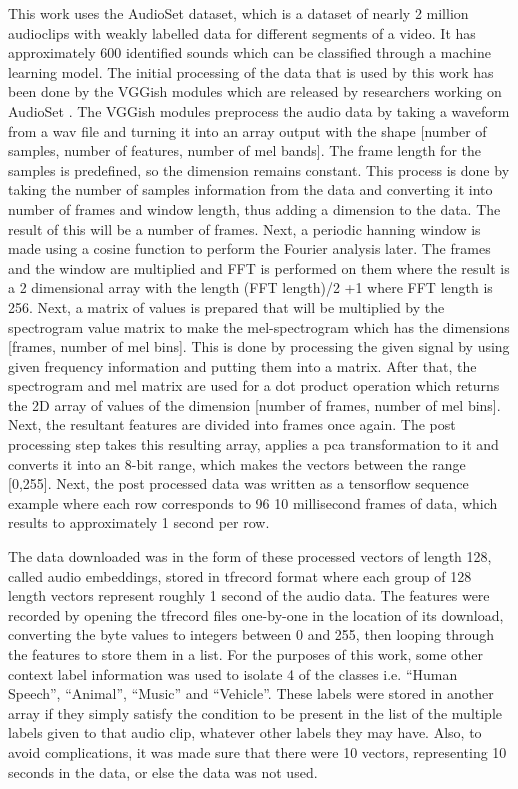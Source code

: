 \documentclass[journal]{IEEEtran}
\begin{document}
This work uses the AudioSet dataset, which is a dataset of nearly 2 million audioclips with weakly labelled data for different segments of a video. It has approximately 600 identified sounds which can be classified through a machine learning model. The initial processing of the data that is used by this work has been done by the VGGish modules which are released by researchers working on AudioSet \cite{11}. The VGGish modules preprocess the audio data by taking a waveform from a wav file and turning it into  an array output with the shape [number of samples, number of features, number of mel bands]. The frame length for the samples is predefined, so the dimension remains constant. This process is done by taking the number of samples information from the data and converting it into number of frames and window length, thus adding a dimension to the data. The result of this will be a number of frames. Next, a periodic hanning window is made using a cosine function to perform the Fourier analysis later. The frames and the window are multiplied and FFT is performed on them where the result is a 2 dimensional array with the length (FFT length)/2 +1 where FFT  length is 256. Next, a matrix of values is prepared that will be multiplied by the spectrogram value matrix to make the mel-spectrogram which has the dimensions [frames, number of mel bins]. This is done by processing the given signal by using given frequency information and putting them into a matrix. After that, the spectrogram and mel matrix are used for a dot product operation which returns the 2D array of values of the dimension [number of frames, number of mel bins]. Next, the resultant features are divided into frames once again. The post processing step takes this resulting array, applies a pca transformation to it and converts it into an 8-bit range, which makes the vectors between the range [0,255]. Next, the post processed data was written as a tensorflow sequence example where each row corresponds to 96 10 millisecond frames of data, which results to approximately 1 second per row.

 The data downloaded was in the form of these processed vectors of length 128, called audio embeddings, stored in tfrecord format where each group of 128 length vectors represent roughly 1 second of the audio data. The features were recorded by opening the tfrecord files one-by-one in the location of its download, converting the byte values to integers between 0 and 255, then looping through the features to store them in a list. For the purposes of this work, some other context label information was used to isolate 4 of the classes i.e. “Human Speech”, “Animal”, “Music” and “Vehicle”. These labels were stored in another array if they simply satisfy the condition to be present in the list of the multiple labels given to that audio clip, whatever other labels they may have. Also, to avoid complications, it was made sure that there were 10 vectors, representing 10 seconds in the data, or else the data was not used. 
\end{document}
